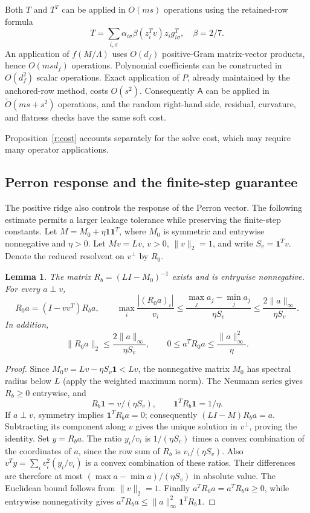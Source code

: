 \documentclass[11pt]{amsart}
\newtheorem{lemma}[theorem]{Lemma}
\theoremstyle{definition}\newtheorem{definition}[theorem]{Definition}
\theoremstyle{remark}\newtheorem{remark}[theorem]{Remark}
\numberwithin{equation}{section}
\begin{document}
Both $T$ and $T^T$ can be applied in $O(ms)$ operations using the
retained-row formula
\[
 T=\sum_{i,\sigma}\alpha_{i\sigma}\beta(z_i^Tv)
                 z_i g_{i\sigma}^T,
 \quad\beta=2/7.
\]
An application of $f(M/\Lambda)$ uses $O(d_f)$ positive-Gram
matrix-vector products, hence $O(msd_f)$ operations. Polynomial
coefficients can be constructed in $O(d_f^2)$ scalar operations. Exact
application of $P$, already maintained by the anchored-row method,
costs $O(s^2)$. Consequently $\mathsf{A}$ can be applied in
$\widetilde O(ms+s^2)$ operations, and the random right-hand side,
residual, curvature, and flatness checks have the same soft cost.

Proposition~\ref{r:cost} accounts separately for the solve cost, which
may require many operator applications.


\subsection{Perron response and the finite-step guarantee}\label{r:response}
The positive ridge also controls the response of the Perron vector.
The following estimate permits a larger leakage tolerance while
preserving the finite-step constants.
Let $M=M_0+\eta\mathbf1\mathbf1^T$, where $M_0$ is symmetric and entrywise
nonnegative and $\eta>0$. Let $Mv=Lv$, $v>0$, $\|v\|_2=1$, and write
$S_v=\mathbf1^Tv$. Denote the reduced resolvent on $v^\perp$ by $R_0$.

\begin{lemma}\label{r:response-lemma}
The matrix $R_b=(LI-M_0)^{-1}$ exists and is entrywise nonnegative.
For every $a\perp v$,
\[
 R_0a=(I-vv^T)R_ba,
 \qquad
 \max_i\frac{|(R_0a)_i|}{v_i}
 \le\frac{\max_j a_j-\min_j a_j}{\eta S_v}
 \le\frac{2\|a\|_\infty}{\eta S_v}.
\]
In addition,
\[
 \|R_0a\|_2\le\frac{2\|a\|_\infty}{\eta S_v},
 \qquad 0\le a^TR_0a\le\frac{\|a\|_\infty^2}{\eta}.
\]
\end{lemma}
\begin{proof}
Since $M_0v=Lv-\eta S_v\mathbf1<Lv$, the nonnegative matrix $M_0$ has
spectral radius below $L$ (apply the weighted maximum norm).
The Neumann series gives $R_b\ge0$ entrywise, and
\[
 R_b\mathbf1=v/(\eta S_v),\qquad
 \mathbf1^TR_b\mathbf1=1/\eta.
\]
If $a\perp v$, symmetry implies $\mathbf1^TR_ba=0$; consequently
$(LI-M)R_ba=a$. Subtracting its component along $v$ gives the unique
solution in $v^\perp$, proving the identity.
Set $y=R_ba$. The ratio $y_i/v_i$ is $1/(\eta S_v)$ times a convex
combination of the coordinates of $a$, since the row sum of $R_b$ is
$v_i/(\eta S_v)$. Also $v^Ty=\sum_i v_i^2(y_i/v_i)$ is a convex
combination of these ratios. Their differences are therefore at most
$(\max a-\min a)/(\eta S_v)$ in absolute value. The Euclidean bound
follows from $\|v\|_2=1$.
Finally $a^TR_0a=a^TR_ba\ge0$, while entrywise nonnegativity gives
$a^TR_ba\le\|a\|_\infty^2\mathbf1^TR_b\mathbf1$.
\end{proof}
\end{document}
